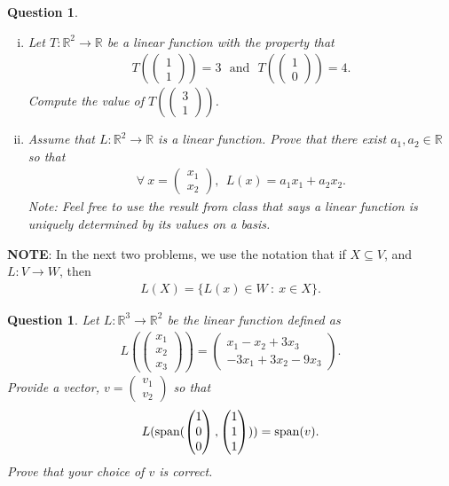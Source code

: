 \documentclass[12pt]{article}
\newtheorem{question}[thm]{Question}
\def\real{{\mathbb R}}
\def\SpanLA{\textnormal{span}}
\newcommand{\ColVecTwo}[2]{\begin{pmatrix} #1\\ #2\end{pmatrix}}
\newcommand{\ColVecThree}[3]{\begin{pmatrix} #1\\ #2\\ #3\end{pmatrix}}
\begin{document}
\vspace{.5cm}

\begin{question}
	\normalfont
	
	
	\begin{enumerate}[(i)]
		\item Let $T:\real^2\to\real$ be a \emph{linear} function with the property that
		\begin{align*}
			T(\ColVecTwo{1}{1}) = 3\ \ \ \text{and}\ \ \ 
			T(\ColVecTwo{1}{0}) = 4.
		\end{align*}
		Compute the value of $T(\ColVecTwo{3}{1})$.
		
		\item Assume that $L:\real^2\to\real$ is a \emph{linear} function.  Prove that there exist $a_1,a_2\in\real$ so that 
		\begin{align*}
			\forall\ x=\ColVecTwo{x_1}{x_2},\ \ L(x) = a_1x_1 + a_2x_2.
		\end{align*}
		\emph{Note: Feel free to use the result from class that says a linear function is uniquely determined by its values on a basis.}
	\end{enumerate}
\end{question}

\vspace{.5cm}

\noindent \textbf{NOTE}: In the next two problems, we use the notation that if $X\subseteq V$, and $L: V \to W$,  then 
	\begin{align*}
		L(X) = \{ L(x)\in W\ :\ x\in X \}.
	\end{align*}
\vspace{.1cm}

\begin{question}
	\normalfont
	Let $L:\real^3\to\real^2$ be the linear function defined as
		\begin{align*}
			L(\ColVecThree{x_1}{x_2}{x_3}) = \ColVecTwo{x_1-x_2+3x_3}{-3x_1+3x_2-9x_3}.
		\end{align*}
		Provide a vector, $v=\ColVecTwo{v_1}{v_2}$ so that 
			\begin{align*}
				L(\SpanLA(\ColVecThree{1}{0}{0}, \ColVecThree{1}{1}{1} ) )= \SpanLA(v).
			\end{align*}
			Prove that your choice of $v$ is correct.
			
		
\end{question}

\vspace{.8cm}
\end{document}
